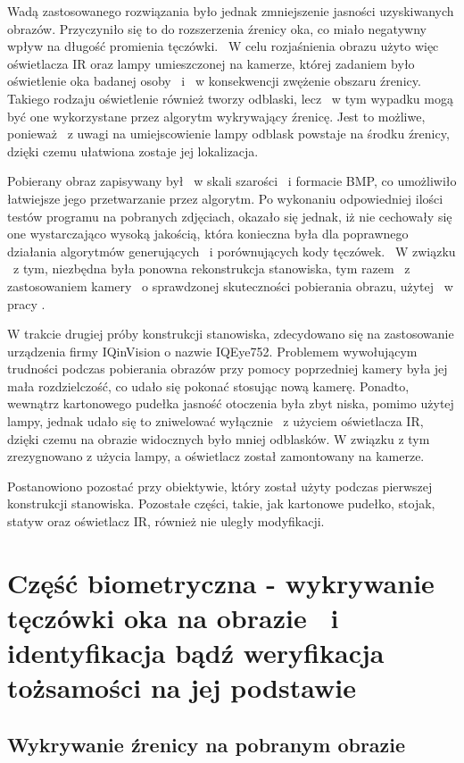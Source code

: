 Wadą zastosowanego rozwiązania było jednak zmniejszenie jasności uzyskiwanych obrazów. Przyczyniło się to do rozszerzenia źrenicy oka, co miało negatywny wpływ na długość promienia tęczówki. ~W celu rozjaśnienia obrazu użyto więc oświetlacza IR oraz lampy umieszczonej na kamerze, której zadaniem było oświetlenie oka badanej osoby ~i ~w konsekwencji zwężenie obszaru źrenicy. Takiego rodzaju oświetlenie również tworzy odblaski, lecz ~w tym wypadku mogą być one wykorzystane przez algorytm wykrywający źrenicę. Jest to możliwe, ponieważ ~z uwagi na umiejscowienie lampy odblask powstaje na środku źrenicy, dzięki czemu ułatwiona zostaje jej lokalizacja.

Pobierany obraz zapisywany był ~w skali szarości ~i formacie BMP, co umożliwiło łatwiejsze jego przetwarzanie przez algorytm. Po wykonaniu odpowiedniej ilości testów programu na pobranych zdjęciach, okazało się jednak, iż nie cechowały się one wystarczająco wysoką jakością, która konieczna była dla poprawnego działania algorytmów generujących ~i porównujących kody tęczówek. ~W związku ~z tym, niezbędna była ponowna rekonstrukcja stanowiska, tym razem ~z zastosowaniem kamery ~o sprawdzonej skuteczności pobierania obrazu, użytej ~w pracy \cite{Gl11}.

W trakcie drugiej próby konstrukcji stanowiska, zdecydowano się na zastosowanie urządzenia firmy IQinVision o nazwie IQEye752. Problemem wywołującym trudności podczas pobierania obrazów przy pomocy poprzedniej kamery była jej mała rozdzielczość, co udało się pokonać stosując nową kamerę. Ponadto, wewnątrz kartonowego pudełka jasność otoczenia była zbyt niska, pomimo użytej lampy, jednak udało się to zniwelować wyłącznie ~z użyciem oświetlacza IR, dzięki czemu na obrazie widocznych było mniej odblasków. W związku z tym zrezygnowano z użycia lampy, a oświetlacz został zamontowany na kamerze.

Postanowiono pozostać przy obiektywie, który został użyty podczas pierwszej konstrukcji stanowiska. Pozostałe części, takie, jak kartonowe pudełko, stojak, statyw oraz oświetlacz IR, również nie uległy modyfikacji.

\section{Część biometryczna - wykrywanie tęczówki oka na obrazie ~i identyfikacja bądź weryfikacja tożsamości na jej podstawie}
\subsection{Wykrywanie źrenicy na pobranym obrazie}
\label{sec:wykrycieZrenicy}


